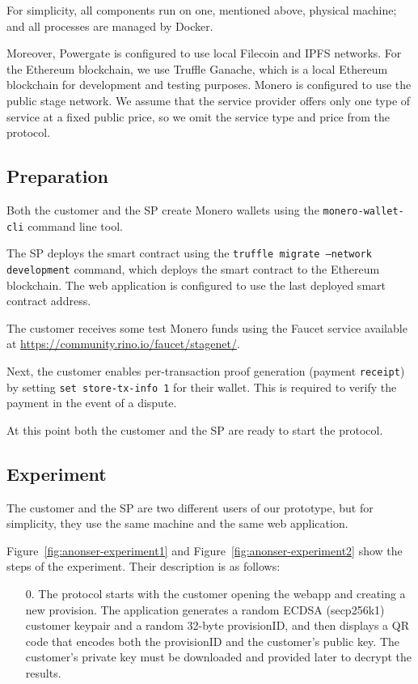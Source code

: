 \documentclass[pdftex,twocolumn,epjc3]{svjour3}
\begin{document}
{For simplicity, all components run on one, mentioned above, physical machine; and all processes are managed by Docker. 

Moreover, Powergate is configured to use local Filecoin and IPFS networks.
For the Ethereum blockchain, we use Truffle Ganache, which is a local Ethereum blockchain for development and testing purposes. 
Monero is configured to use the public stage network.
We assume that the service provider offers only one type of service at a fixed public price, so we omit the service type and price from the protocol.

\subsection*{Preparation}

Both the customer and the SP create Monero wallets using the \texttt{monero-wallet-cli} command line tool.

The SP deploys the smart contract using the \texttt{truffle migrate --network development} command, which deploys the smart contract to the Ethereum blockchain. The web application is configured to use the last deployed smart contract address.

The customer receives some test Monero funds using the Faucet service available at \url{https://community.rino.io/faucet/stagenet/}.

Next, the customer enables per-transaction proof generation (payment \texttt{receipt}) by setting \texttt{set store-tx-info 1} for their wallet. This is required to verify the payment in the event of a dispute.

At this point both the customer and the SP are ready to start the protocol.

\subsection*{Experiment}

The customer and the SP are two different users of our prototype, but for simplicity, they use the same machine and the same web application.

Figure~\ref{fig:anonser-experiment1} and Figure~\ref{fig:anonser-experiment2} show the steps of the experiment. Their description is as follows:

\begin{enumerate}
  \setcounter{enumi}{0}
  \item[0.] The protocol starts with the customer opening the webapp and creating a new provision.
The application generates a random ECDSA (secp256k1) customer keypair and a random 32-byte provisionID, and then displays a QR code that encodes both the provisionID and the customer's public key. 
The customer's private key must be downloaded and provided later to decrypt the results.


\end{enumerate}}
\end{document}
